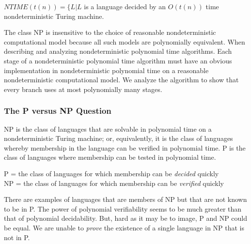 \documentclass{article}
\begin{document}
\begin{definition}
  $NTIME(t(n)) = \{L|L$ is a language decided by an $O(t(n))$ time nondeterministic Turing machine. 
\end{definition}

The class NP is insensitive to the choice of reasonable nondeterministic computational model because all such models are polynomially equivalent. When describing and analyzing nondeterministic polynomial time algorithms. Each stage of a nondeterministic polynomial time algorithm must have an obvious implementation in nondeterministic polynomial time on a reasonable nondeterministic computational model. We analyze the algorithm to show that every branch uses at most polynomially many stages. 

\subsubsection{The P versus NP Question}

NP is the class of languages that are solvable in polynomial time on a nondeterministic Turing machine; or, equivalently, it is the class of languages whereby membership in the language can be verified in polynomial time. P is the class of languages where membership can be tested in polynomial time. 
\begin{center}
  P = the class of languages for which membership can be \emph{decided} quickly \\ 
  NP = the class of languages for which membership can be \emph{verified} quickly
\end{center}
There are examples of languages that are members of NP but that are not known to be in P. The power of polynomial verifiability seems to be much greater than that of polynomial decidability. But, hard as it may be to image, P and NP could be equal. We are unable to \emph{prove} the existence of a single language in NP that is not in P. 
\end{document}
